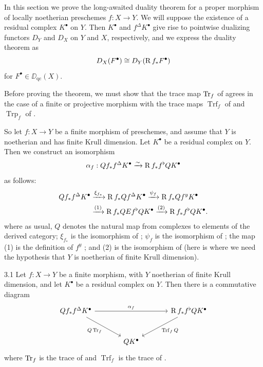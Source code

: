 In this section we prove the long-awaited duality theorem for a proper morphism of locally noetherian preschemes $f: X \to Y$. We will suppose the existence of a residual complex $K^{\bullet}$ on $Y$. Then $K^{\bullet}$ and $f^{\Delta}K^{\bullet}$ give rise to pointwise dualizing functors $D_{Y}$ and $D_{X}$ on $Y$ and $X$, respectively, and we express the duality theorem as
\[
D_{X}(F^{\bullet}) \cong D_{Y}(\operatorname{R} f_{*}F^{\bullet})
\]
for $F^{\bullet} \in \DD_{\mathrm{qc}}(X)$.

Before proving the theorem, we must show that the trace map $\operatorname{Tr}_{f}$ of  agrees in the case of a finite or projective morphism with the trace maps $\operatorname{Trf}_{f}$ of  and $\operatorname{Trp}_{f}$ of .

So let $f: X \to Y$ be a finite morphism of preschemes, and assume that $Y$ is noetherian and has finite Krull dimension. Let $K^{\bullet}$ be a residual complex on $Y$. Then we construct an isomorphism
\[
\alpha_{f}: Q f_{*} f^{\Delta} K^{\bullet} \xrightarrow{\sim} \operatorname{R} f_{*} f^{\flat} Q K^{\bullet}
\]
as follows:
\[
\begin{aligned}
Q f_{*} f^{\Delta} K^{\bullet}
&\xrightarrow{\xi_{f_{*}}} \operatorname{R} f_{*} Q f^{\Delta} K^{\bullet}
 \xrightarrow{\psi_{f}} \operatorname{R} f_{*} Q f^{y} K^{\bullet} \\
&\xrightarrow{(1)} \operatorname{R} f_{*} QE f^{\flat} Q K^{\bullet}
 \xrightarrow{(2)} \operatorname{R} f_{*} f^{\flat} Q K^{\bullet}.
\end{aligned}
\]
where as usual, $Q$ denotes the natural map from complexes to elements of the derived category; $\xi_{f_{*}}$ is the isomorphism of ; $\psi_{f}$ is the isomorphism of ; the map (1) is the definition of $f^{y}$ ; and (2) is the isomorphism of  (here is where we need the hypothesis that $Y$ is noetherian of finite Krull dimension).

\begin{bookproposition}{3.1}\label{prop:7.3.1}
Let $f: X \to Y$ be a finite morphism, with $Y$ noetherian of finite Krull dimension, and let $K^{\bullet}$ be a residual complex on $Y$. Then there is a commutative diagram
\[
\begin{tikzcd}[row sep=large, column sep=large]
Q f_{*} f^{\Delta} K^{\bullet} \ar[rr,"\alpha_{f}"] \ar[rd,"Q \Tr_{f}"'] && \RR f_{*} f^{\flat} Q K^{\bullet} \ar[ld,"\operatorname{Trf}_{f}Q"] \\
& Q K^{\bullet}
\end{tikzcd}
\]
where $\operatorname{Tr}_{f}$ is the trace of  and $\operatorname{Trf}_{f}$ is the trace of .
\end{bookproposition}

